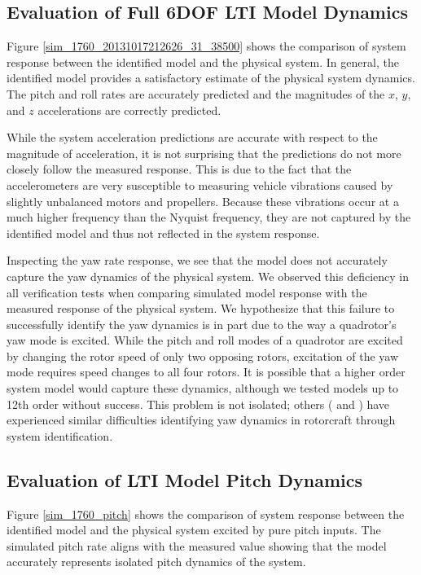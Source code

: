 \subsection{Evaluation of Full 6DOF LTI Model Dynamics}
Figure \ref{sim_1760_20131017212626_31_38500} shows the comparison of system response between the identified model and the physical system. In general, the identified model provides a satisfactory estimate of the physical system dynamics. The pitch and roll rates are accurately predicted and the magnitudes of the $x$, $y$, and $z$ accelerations are correctly predicted. 

While the system acceleration predictions are accurate with respect to the magnitude of acceleration, it is not surprising that the predictions do not more closely follow the measured response. This is due to the fact that the accelerometers are very susceptible to measuring vehicle vibrations caused by slightly unbalanced motors and propellers. Because these vibrations occur at a much higher frequency than the Nyquist frequency, they are not captured by the identified model and thus not reflected in the system response.

Inspecting the yaw rate response, we see that the model does not accurately capture the yaw dynamics of the physical system. We observed this deficiency in all verification tests when comparing simulated model response with the measured response of the physical system. We hypothesize that this failure to successfully identify the yaw dynamics is in part due to the way a quadrotor's yaw mode is excited. While the pitch and roll modes of a quadrotor are excited by changing the rotor speed of only two opposing rotors, excitation of the yaw mode requires speed changes to all four rotors. It is possible that a higher order system model would capture these dynamics, although we tested models up to 12th order without success. This problem is not isolated; others (\cite{lee2011attitude} and \cite{mettler2000system}) have experienced similar difficulties identifying yaw dynamics in rotorcraft through system identification.

\subsection{Evaluation of LTI Model Pitch Dynamics}
Figure \ref{sim_1760_pitch} shows the comparison of system response between the identified model and the physical system excited by pure pitch inputs. The simulated pitch rate aligns with the measured value showing that the model accurately represents isolated pitch dynamics of the system.


